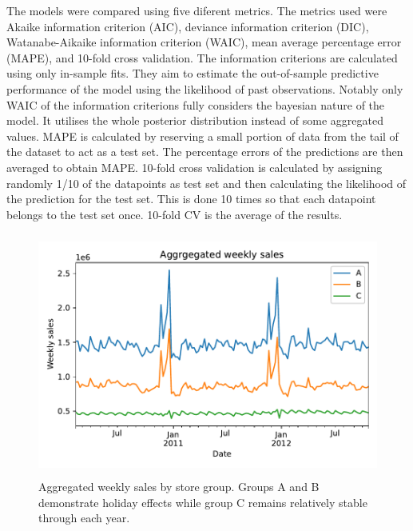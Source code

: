 \documentclass[english, 12pt, a4paper, sci, utf8, a-1b, online]{aaltothesis}
\begin{document}


The models were compared using five diferent metrics. The metrics used were Akaike information criterion (AIC), deviance information criterion (DIC),
Watanabe-Aikaike information criterion (WAIC), mean average percentage error (MAPE), and 10-fold cross validation. The information criterions are calculated using only
in-sample fits. They aim to estimate the out-of-sample predictive performance of the model using the likelihood of past observations. Notably only WAIC of the information criterions
fully considers the bayesian nature of the model. It utilises the whole posterior distribution instead of some aggregated values. MAPE is calculated by reserving a 
small portion of data from the tail of the dataset to act as a test set. The percentage errors of the predictions are then averaged to obtain MAPE. 10-fold cross validation
is calculated by assigning randomly 1/10 of the datapoints as test set and then calculating the likelihood of the prediction for the test set. This is done 10 times
so that each datapoint belongs to the test set once. 10-fold CV is the average of the results.









\begin{figure}[htb]
	\centering
	\includegraphics[height=8cm]{../plots/dataset/dataset_plot_y.pdf}
	\caption{Aggregated weekly sales by store group. Groups A and B demonstrate holiday effects while group C remains relatively stable through each year.
	}
	\label{fig:data_y}
\end{figure}
\end{document}
